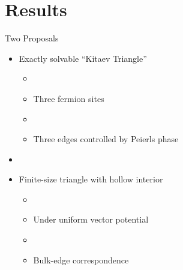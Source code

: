 \documentclass[xcolor=dvipsnames,10pt,aspectratio=169]{beamer}
\newcommand{\RE}{Results}
\begin{document}
  \section{\RE}

  \begin{frame}{Two Proposals}
    \begin{itemize}
      \item Exactly solvable ``Kitaev Triangle''
        \begin{itemize}
          \item[]
          \item Three fermion sites
          \item[]
          \item Three edges controlled by Peierls phase
        \end{itemize}
      \item[]
      \pause
      \item Finite-size triangle with hollow interior
        \begin{itemize}
          \item[]
          \item Under uniform vector potential
          \item[]
          \item Bulk-edge correspondence
        \end{itemize}
    \end{itemize}
  \end{frame}
\end{document}

